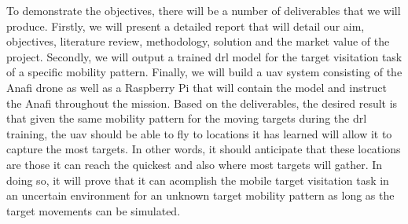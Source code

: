 \documentclass[../main.tex]{subfiles}
\begin{document}

To demonstrate the objectives, there will be a number 
of deliverables that we will produce.
Firstly, we will present a detailed report that will detail
our aim, objectives, literature review, methodology,
solution and the market value of the project.
Secondly, we will output a trained \gls{drl} model for 
the target visitation task of a specific
mobility pattern.
Finally, we will build a \gls{uav} system
consisting of the Anafi drone as well as a Raspberry Pi
that will contain the model and instruct
the Anafi throughout the mission.
Based on the deliverables, the desired result is that
given the same mobility pattern for 
the moving targets during the \gls{drl} training,
the \gls{uav} should be able to fly to locations it has learned
will allow it to capture the most targets. In other words,
it should anticipate that these locations are those it can reach
the quickest and also where most targets will gather.
In doing so, it will prove that it can acomplish 
the mobile target visitation task in an uncertain environment
for an unknown target mobility pattern
as long as the target movements can be simulated.

\blindtext
\end{document}

